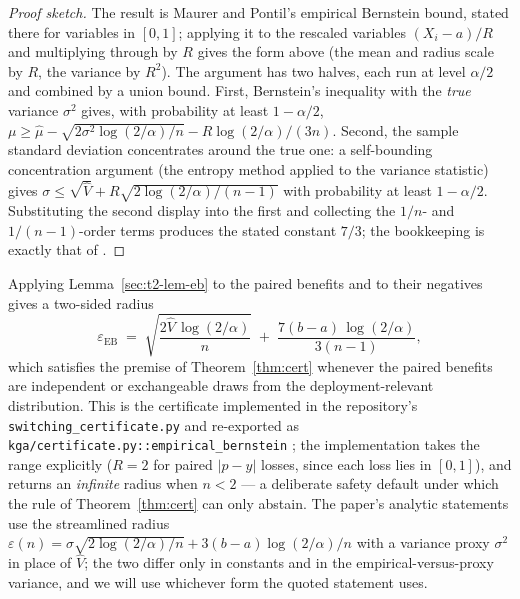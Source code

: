 \begin{proof}[Proof sketch]
The result is Maurer and Pontil's empirical Bernstein bound, stated there for variables
in $[0,1]$; applying it to the rescaled variables $(X_i-a)/R$ and multiplying through
by $R$ gives the form above (the mean and radius scale by $R$, the variance by $R^2$).
The argument has two halves, each run at level $\alpha/2$ and combined by a union
bound. First, Bernstein's inequality with the \emph{true} variance $\sigma^2$ gives,
with probability at least $1-\alpha/2$,
$\mu\ge\widehat\mu-\sqrt{2\sigma^2\log(2/\alpha)/n}-R\log(2/\alpha)/(3n)$. Second, the
sample standard deviation concentrates around the true one: a self-bounding
concentration argument (the entropy method applied to the variance statistic) gives
$\sigma\le\sqrt{\widehat V}+R\sqrt{2\log(2/\alpha)/(n-1)}$ with probability at least
$1-\alpha/2$. Substituting the second display into the first and collecting the
$1/n$- and $1/(n-1)$-order terms produces the stated constant $7/3$; the bookkeeping is
exactly that of \cite{maurer2009empirical}. \qedhere
\end{proof}

Applying Lemma~\ref{sec:t2-lem-eb} to the paired benefits and to their negatives gives
a two-sided radius
\[
\varepsilon_{\mathrm{EB}}
\;=\;\sqrt{\frac{2\widehat V\,\log(2/\alpha)}{n}}
\;+\;\frac{7(b-a)\,\log(2/\alpha)}{3(n-1)} ,
\]
which satisfies the premise of Theorem~\ref{thm:cert} whenever the paired benefits are
independent or exchangeable draws from the deployment-relevant distribution. This is
the certificate implemented in the repository's
\texttt{switching\_certificate.py} and re-exported as
\texttt{kga/certificate.py::empirical\_bernstein} \cite{kbound2026repo}; the
implementation takes the range explicitly ($R=2$ for paired $|p-y|$ losses, since each
loss lies in $[0,1]$), and returns an \emph{infinite} radius when $n<2$ --- a
deliberate safety default under which the rule of Theorem~\ref{thm:cert} can only
abstain. The paper's analytic statements use the streamlined radius
$\varepsilon(n)=\sigma\sqrt{2\log(2/\alpha)/n}+3(b-a)\log(2/\alpha)/n$ with a variance
proxy $\sigma^2$ in place of $\widehat V$; the two differ only in constants and in the
empirical-versus-proxy variance, and we will use whichever form the quoted statement
uses.

